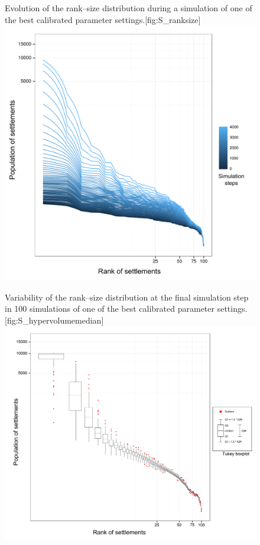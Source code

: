 \begin{figure}[!htbp]
\begin{sidecaption}[fortoc]{Evolution of the rank–size distribution during a simulation of one of the best calibrated parameter settings.}[fig:S_ranksize]
  \centering
 \includegraphics[width=1.0\linewidth]{RTbleu.png}
  \end{sidecaption}
\end{figure}

\begin{figure}[!htbp]
\begin{sidecaption}[fortoc]{Variability of the rank–size distribution at the final simulation step in 100 simulations of one of the best calibrated parameter settings.}[fig:S_hypervolumemedian]
  \centering
 \includegraphics[width=1.0\linewidth]{varRTrouge.png}
  \end{sidecaption}
\end{figure}


